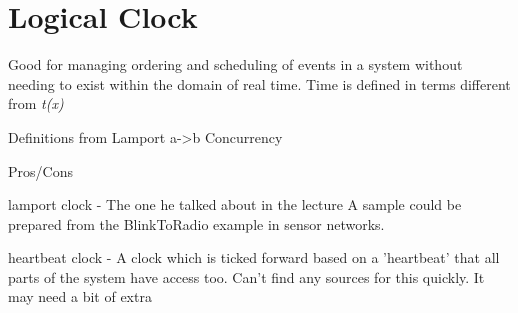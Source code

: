 \section{Logical Clock}\label{sc:logicalClock}

Good for managing ordering and scheduling of events in a system without needing to exist within the domain of real time. Time is defined in terms different from \textit{t(x)}

Definitions from Lamport
    a->b
    Concurrency


Pros/Cons

lamport clock - The one he talked about in the lecture
    A sample could be prepared from the BlinkToRadio example in sensor networks.

heartbeat clock - A clock which is ticked forward based on a 'heartbeat' that all parts of the system have access too.
    Can't find any sources for this quickly. It may need a bit of extra 


